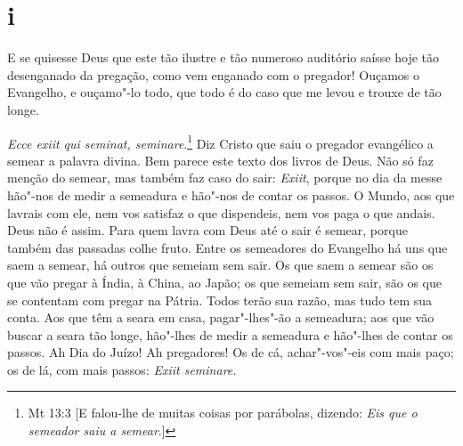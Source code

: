 \section*{i}

\noindent{}E se quisesse Deus que este tão ilustre e tão numeroso auditório saísse
hoje tão desenganado da pregação, como vem enganado com o pregador!
Ouçamos o Evangelho, e ouçamo"-lo todo, que todo é do caso que me levou e
trouxe de tão longe.

\emph{Ecce exiit qui seminat, seminare}.\footnote{Mt 13:3 [E falou-lhe de muitas coisas por parábolas, dizendo: \textit{Eis que o semeador saiu a semear}.]} Diz Cristo que saiu o pregador evangélico a semear a palavra divina. Bem parece este texto dos
livros de Deus. Não só faz menção do semear, mas também faz caso do
sair: \emph{Exiit}, porque no dia da messe hão"-nos de medir a semeadura
e hão"-nos de contar os passos. O Mundo, aos que lavrais com ele, nem vos
satisfaz o que dispendeis, nem vos paga o que andais. Deus não é assim.
Para quem lavra com Deus até
o sair é semear, porque também das passadas colhe fruto. Entre os
semeadores do Evangelho há uns que saem a semear, há outros que
semeiam sem sair. Os que saem a semear são os que vão pregar à Índia, à
China, ao Japão; os que semeiam sem sair, são os que se contentam com
pregar na Pátria. Todos terão sua razão, mas tudo tem sua conta. Aos que
têm a seara em casa, pagar"-lhes"-ão a semeadura; aos que vão buscar a
seara tão longe, hão"-lhes de medir a semeadura e hão"-lhes de contar os
passos. Ah Dia do Juízo! Ah pregadores! Os de cá, achar"-vos"-eis com mais
paço; os de lá, com mais passos: \emph{Exiit seminare.}


